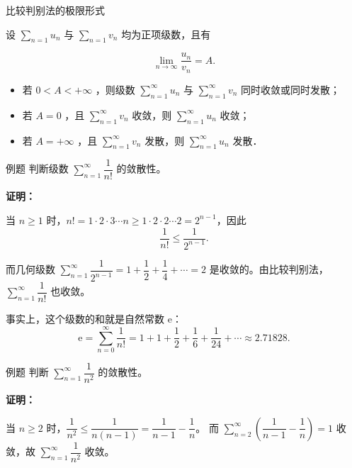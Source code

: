 \documentclass[aspectratio=169,10pt]{ctexbeamer}
\newcommand{\ee}{\mathrm{e}}
\begin{document}
\begin{frame}{比较判别法的极限形式}
	\normalsize
	\begin{block}{}
		
		设 $\sum_{n=1} u_n$ 与 $\sum_{n=1} v_n$ 均为正项级数，且有
		
		$$
		\lim _{n \rightarrow \infty} \frac{u_n}{v_n}=A .
		$$
		\vspace{0.4cm}
		
		\begin{itemize}
			\item[（1）] 若 $0<A<+\infty$ ，则级数 $\sum_{n=1}^{\infty} u_n$ 与 $\sum_{n=1}^{\infty} v_n$ 同时收敛或同时发散；
			\vspace{0.4cm}
			\item[（2）] 若 $A=0$ ，且 $\sum_{n=1}^{\infty} v_n$ 收敛，则 $\sum_{n=1}^{\infty} u_n$ 收敛；
			\vspace{0.4cm}
			\item[（3）] 若 $A=+\infty$ ，且 $\sum_{n=1}^{\infty} v_n$ 发散，则 $\sum_{n=1}^{\infty} u_n$ 发散．
		\end{itemize}
	\end{block}
	
\end{frame}

\begin{frame}
	\begin{block}{例题}
		判断级数 \(\sum\limits_{n = 1}^{  \infty } \dfrac{1}{n!}\) 的敛散性。
	\end{block}
	\pause
	\textbf{证明：}
	
	当 \(n \geq 1\) 时，\(n! = 1 \cdot 2 \cdot 3 \cdots n \geq 1 \cdot 2 \cdot 2 \cdots 2 = 2^{n-1}\)，因此
	\[
	\dfrac{1}{n!} \leq \dfrac{1}{2^{n-1}}.
	\]
	
	而几何级数 \(\sum\limits_{n = 1}^{  \infty } \dfrac{1}{2^{n-1}} = 1 + \dfrac12 + \dfrac14 + \cdots = 2\) 是收敛的。由比较判别法，\(\sum\limits_{n = 1}^{  \infty } \dfrac{1}{n!}\) 也收敛。
	
	事实上，这个级数的和就是自然常数 \(\ee\)：
	\[
	\ee = \sum_{n=0}^{\infty} \dfrac{1}{n!} = 1 + 1 + \dfrac12 + \dfrac16 + \dfrac{1}{24} + \cdots \approx 2.71828.
	\]
	
\end{frame}

\begin{frame}
	\begin{block}{例题}
		判断 \(\sum\limits_{n = 1}^{  \infty } \dfrac{1}{n^2}\) 的敛散性。
	\end{block}
	\pause
	\vspace{0.7cm}
	\textbf{证明：}
	
	当 \(n \geq 2\) 时，\(\dfrac{1}{n^2} \leq \dfrac{1}{n(n-1)} = \dfrac{1}{n-1} - \dfrac{1}{n}\)。
	而 \(\sum\limits_{n = 2}^{  \infty } \left(\dfrac{1}{n-1} - \dfrac{1}{n}\right) = 1\) 收敛，故 \(\sum\limits_{n = 1}^{  \infty } \dfrac{1}{n^2}\) 收敛。
	
\end{frame}
\end{document}
